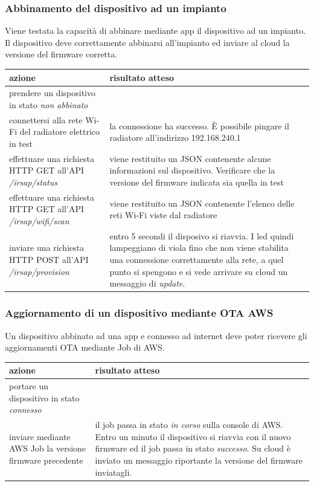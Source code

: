 \documentclass[a4paper,titlepage]{article}
\begin{document}
\subsubsection{Abbinamento del dispositivo ad un impianto}

Viene testata la capacità di abbinare mediante app il dispositivo ad un impianto.
Il dispositivo deve correttamente abbinarsi all’impianto ed inviare al cloud la versione
del firmware corretta.

\begin{center}
\begin{tabular}{| p{5cm} | p{5cm} |}
    \hline \textbf{azione} & \textbf{risultato atteso} \\
    \hline prendere un dispositivo in stato \textit{non abbinato} & \\
    \hline connettersi alla rete Wi-Fi del radiatore elettrico in test & la connessione ha successo. È possibile pingare il radiatore all'indirizzo 192.168.240.1 \\
    \hline effettuare una richiesta HTTP GET all'API \textit{/irsap/status} & viene restituito un JSON contenente alcune informazioni sul dispositivo. Verificare che la versione del firmware indicata sia quella in test \\
    \hline effettuare una richiesta HTTP GET all'API \textit{/irsap/wifi/scan} & viene restituito un JSON contenente l'elenco delle reti Wi-Fi viste dal radiatore \\
    \hline inviare una richiesta HTTP POST all'API \textit{/irsap/provision} & entro 5 secondi il disposivo si riavvia. I led quindi lampeggiano di viola fino che non viene stabilita una connessione correttamente alla rete, a quel punto si spengono e si vede arrivare su cloud un messaggio di \textit{update}. \\
    \hline
\end{tabular}
\end{center}

\subsubsection{Aggiornamento di un dispositivo mediante OTA AWS}

Un dispositivo abbinato ad una app e connesso ad internet deve poter ricevere gli
aggiornamenti OTA mediante Job di AWS.

\begin{center}
\begin{tabular}{| p{5cm} | p{5cm} |}
    \hline \textbf{azione} & \textbf{risultato atteso} \\
    \hline portare un dispositivo in stato \textit{connesso} & \\
    \hline inviare mediante AWS Job la versione firmware precedente & il job passa in stato \textit{in corso} sulla console di AWS. Entro un minuto il dispositivo si riavvia con il nuovo firmware ed il job passa in stato \textit{successo}. Su cloud è inviato un messaggio riportante la versione del firmware inviatagli. \\
    \hline
\end{tabular}
\end{center}
\end{document}
